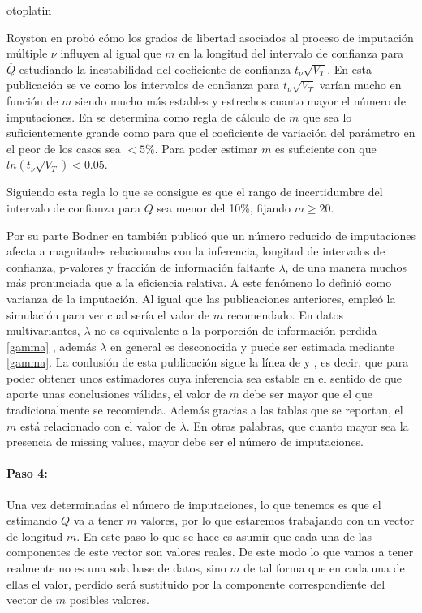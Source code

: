 otoplatin\documentclass[a4paper,openright,12pt]{report}
\begin{document}
Royston en \cite{Royston2004} probó cómo los grados de libertad asociados al proceso de imputación múltiple $\nu$ influyen al igual que $m$ en la longitud del intervalo de confianza para $\overline{Q}$ estudiando la inestabilidad del coeficiente de confianza $t_{\nu}\sqrt{V_{T}}$. En esta publicación se ve como los intervalos de confianza para $t_{\nu}\sqrt{V_{T}}$ varían mucho en función de $m$ siendo mucho más estables y estrechos cuanto mayor el número de imputaciones. En \cite{Royston2004} se determina como regla de cálculo de $m$ que sea lo suficientemente grande como para que el coeficiente de variación del parámetro en el peor de los casos sea $<5\%$. Para poder estimar $m$ es suficiente con que $ln(t_{\nu}\sqrt{V_{T}})<0.05$.

Siguiendo esta regla lo que se consigue es que el rango de incertidumbre del intervalo de confianza para $Q$ sea menor del 10\%, fijando $m \geq 20$.

Por su parte Bodner en \cite{Bodner2008} también publicó que un número reducido de imputaciones afecta a magnitudes relacionadas con la inferencia, longitud de intervalos de confianza, p-valores y fracción de información faltante $\lambda$, de una manera muchos más pronunciada que a la eficiencia relativa. A este fenómeno lo definió como varianza de la imputación. Al igual que las publicaciones anteriores, empleó la simulación para ver cual sería el valor de $m$ recomendado. En datos multivariantes, $\lambda$ no es equivalente a la porporción de información perdida \ref{gamma} \cite{Longford2005}, además $\lambda$ en general es desconocida y puede ser estimada mediante \ref{gamma}. La conlusión de esta publicación sigue la línea de \cite{Graham2007} y \cite{Royston2004}, es decir, que para poder obtener unos estimadores cuya inferencia sea estable en el sentido de que aporte unas conclusiones válidas, el  valor de $m$ debe ser mayor que el que tradicionalmente se recomienda. Además gracias a las tablas que se reportan, el $m$ está relacionado con el valor de $\lambda$. En otras palabras, que cuanto mayor sea la presencia de missing values, mayor debe ser el número de imputaciones.

\paragraph{Paso 4:}
Una vez determinadas el número de imputaciones, lo que tenemos es que el estimando $Q$ va a tener $m$ valores, por lo que estaremos trabajando con un vector de longitud $m$. En este paso lo que se hace es asumir que cada una de las componentes de este vector son valores reales. De este modo lo que vamos a tener realmente no es una sola base de datos, sino $m$ de tal forma que en cada una de ellas el valor, perdido será sustituido por la componente correspondiente del vector de $m$ posibles valores.
\end{document}
